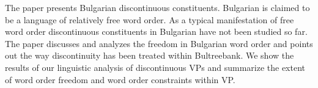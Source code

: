 The paper presents Bulgarian discontinuous constituents. Bulgarian is claimed to be a language of relatively free word order. As a typical manifestation of free word order discontinuous constituents in Bulgarian have not been studied so far. The paper discusses and analyzes the freedom in Bulgarian word order and points out the way discontinuity has been treated within Bultreebank. We show the results of our linguistic analysis of discontinuous VPs and summarize the extent of word order freedom and word order constraints within VP.
